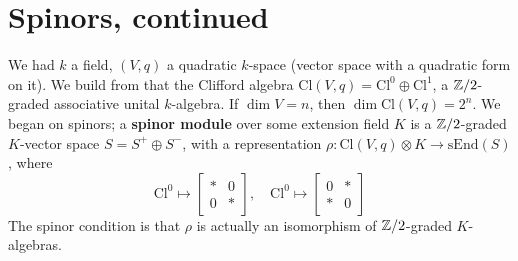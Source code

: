 \section{Spinors, continued} 
We had $k$ a field, $(V,q)$ a quadratic $k$-space (vector space with a quadratic form on it). We build from that the Clifford algebra $\mathrm{Cl}(V,q) = \mathrm{Cl}^0 \oplus \mathrm{Cl}^1$, a $\mathbb{Z}/2$-graded associative unital $k$-algebra. If $\dim V = n$, then $\dim \mathrm{Cl}(V,q)= 2^n $. We began on spinors; a \textbf{spinor module} over some extension field $K$ is a $\mathbb{Z}/2$-graded $ K$-vector space $S = S^+ \oplus S^-$, with a representation $\rho \colon \mathrm{Cl}(V,q)\otimes K \to \mathrm{sEnd}(S)$, where  
\begin{equation*}
    \mathrm{Cl^0}\mapsto 
    \begin{bmatrix}
        *  & 0 \\ 0 & *
    \end{bmatrix},\quad
    \mathrm{Cl^0}\mapsto 
    \begin{bmatrix}
        0  & * \\ * & 0
    \end{bmatrix}
\end{equation*}
The spinor condition is that $\rho$ is actually an isomorphism of $\mathbb{Z} /2$-graded $K$-algebras.
